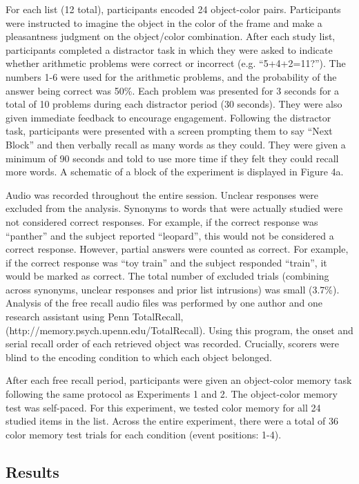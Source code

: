 For each list (12 total), participants encoded 24 object-color pairs.
Participants were instructed to imagine the object in the color of the
frame and make a pleasantness judgment on the object/color combination.
After each study list, participants completed a distractor task in which
they were asked to indicate whether arithmetic problems were correct or
incorrect (e.g. ``5+4+2=11?''). The numbers 1-6 were used for the
arithmetic problems, and the probability of the answer being correct was
50\%. Each problem was presented for 3 seconds for a total of 10
problems during each distractor period (30 seconds). They were also
given immediate feedback to encourage engagement. Following the
distractor task, participants were presented with a screen prompting
them to say ``Next Block'' and then verbally recall as many words as
they could. They were given a minimum of 90 seconds and told to use more
time if they felt they could recall more words. A schematic of a block
of the experiment is displayed in Figure 4a.

Audio was recorded throughout the entire session. Unclear responses were
excluded from the analysis. Synonyms to words that were actually studied
were not considered correct responses. For example, if the correct
response was ``panther'' and the subject reported ``leopard'', this
would not be considered a correct response. However, partial answers
were counted as correct. For example, if the correct response was ``toy
train'' and the subject responded ``train'', it would be marked as
correct. The total number of excluded trials (combining across synonyms,
unclear responses and prior list intrusions) was small (3.7\%). Analysis
of the free recall audio files was performed by one author and one
research assistant using Penn TotalRecall,
(http://memory.psych.upenn.edu/TotalRecall). Using this program, the
onset and serial recall order of each retrieved object was recorded.
Crucially, scorers were blind to the encoding condition to which each
object belonged.

After each free recall period, participants were given an object-color
memory task following the same protocol as Experiments 1 and 2. The
object-color memory test was self-paced. For this experiment, we tested
color memory for all 24 studied items in the list. Across the entire
experiment, there were a total of 36 color memory test trials for each
condition (event positions: 1-4).

\subsection{Results}\label{results-2}

